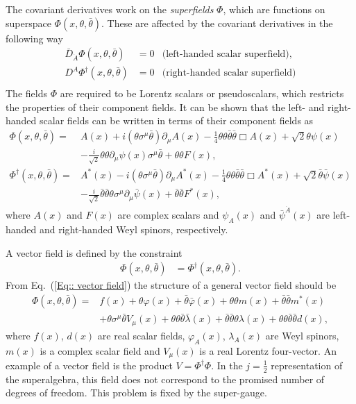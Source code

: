 \documentclass[twoside,english]{uiofysmaster}
\begin{document}
The covariant derivatives work on the \textit{superfields} $\Phi$, which are functions on superspace $\Phi(x, \theta, \bar{\theta})$. These are affected by the covariant derivatives in the following way
\begin{align}
\bar{D}_{\dot{A}} \Phi (x, \theta, \bar{\theta}) &= 0 &\text{(left-handed scalar superfield)},\\
D^A \Phi^{\dagger} (x, \theta, \bar{\theta}) &= 0 &\text{(right-handed scalar superfield)}\\
\end{align}
The fields $\Phi$ are required to be Lorentz scalars or pseudoscalars, which restricts the properties of their component fields. It can be shown that the left- and right-handed scalar fields can be written in terms of their component fields as  \cite{batzing2017lecture}
\begin{align}
\Phi (x, \theta, \bar{\theta}) =& A(x) + i (\theta \sigma^{\mu} \bar{\theta}) \partial_{\mu} A(x) - \frac{1}{4} \theta \theta \bar{\theta} \bar{\theta} \Box A(x) + \sqrt{2} \theta \psi (x)\nonumber \\ 
& - \frac{i}{\sqrt{2}} \theta \theta \partial_{\mu} \psi (x) \sigma^{\mu} \bar{\theta} + \theta \theta F(x),\\
\Phi^{\dagger} (x, \theta, \bar{\theta}) =& A^*(x) - i (\theta \sigma^{\mu} \bar{\theta}) \partial_{\mu} A^*(x) - \frac{1}{4} \theta \theta \bar{\theta} \bar{\theta} \Box A^*(x) + \sqrt{2} \bar{\theta} \bar{\psi} (x)\nonumber \\
& - \frac{i}{\sqrt{2}} \bar{\theta} \bar{\theta} \theta \sigma^{\mu} \partial_{\mu} \bar{\psi} (x)  + \bar{\theta} \bar{\theta} F^*(x),
\end{align}
where $A(x)$ and $F(x)$ are complex scalars and $\psi_A(x)$ and $\bar{\psi}^{\dot{A}} (x)$ are left-handed and right-handed Weyl spinors, respectively. 

A vector field is defined by the constraint
\begin{align}
\Phi (x, \theta, \bar{\theta}) &= \Phi^{\dagger} (x, \theta, \bar{\theta}).\label{Eq:: vector field}
\end{align}
From Eq.\ (\ref{Eq:: vector field}) the structure of a general vector field should be  \cite{batzing2017lecture}
\begin{align}
\Phi (x, \theta, \bar{\theta}) =& f(x) + \theta \varphi (x) + \bar{\theta} \bar{\varphi} (x) + \theta \theta m(x) + \bar{\theta} \bar{\theta} m^* (x) \nonumber \\
&+ \theta \sigma^{\mu} \bar{\theta} V_{\mu} (x) + \theta \theta \bar{\theta} \bar{\lambda} (x) + \bar{\theta} \bar{\theta} \theta \lambda (x) + \theta \theta \bar{\theta} \bar{\theta} d(x),
\end{align}
where $f(x)$, $d(x)$ are real scalar fields, $\varphi_A (x)$, $\lambda_A (x)$ are Weyl spinors, $m(x)$ is a complex scalar field and $V_{\mu} (x)$ is a real Lorentz four-vector. An example of a vector field is the product $V = \Phi^{\dagger} \Phi$. In the $j = \frac{1}{2}$ representation of the superalgebra, this field does not correspond to the promised number of degrees of freedom. This problem is fixed by the super-gauge. 
\end{document}
